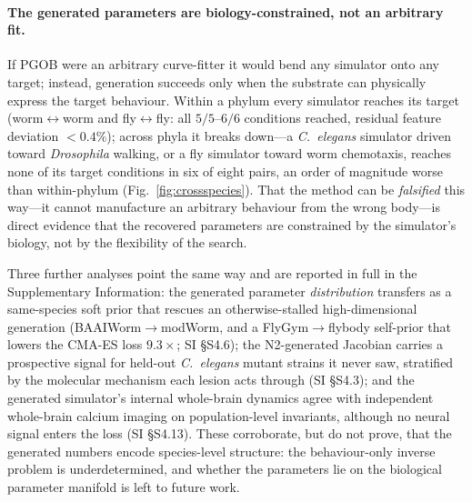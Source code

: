 \documentclass[11pt]{article}
\begin{document}
\paragraph{The generated parameters are biology-constrained, not an arbitrary fit.} If PGOB were an arbitrary curve-fitter it would bend any simulator onto any target; instead, generation succeeds only when the substrate can physically express the target behaviour. Within a phylum every simulator reaches its target (worm$\leftrightarrow$worm and fly$\leftrightarrow$fly: all $5/5$--$6/6$ conditions reached, residual feature deviation $<0.4\%$); across phyla it breaks down---a \emph{C.~elegans} simulator driven toward \emph{Drosophila} walking, or a fly simulator toward worm chemotaxis, reaches none of its target conditions in six of eight pairs, an order of magnitude worse than within-phylum (Fig.~\ref{fig:crossspecies}). That the method can be \emph{falsified} this way---it cannot manufacture an arbitrary behaviour from the wrong body---is direct evidence that the recovered parameters are constrained by the simulator's biology, not by the flexibility of the search.

Three further analyses point the same way and are reported in full in the Supplementary Information: the generated parameter \emph{distribution} transfers as a same-species soft prior that rescues an otherwise-stalled high-dimensional generation (BAAIWorm$\to$modWorm, and a FlyGym$\to$flybody self-prior that lowers the CMA-ES loss $9.3\times$; SI \S S4.6); the N2-generated Jacobian carries a prospective signal for held-out \emph{C.~elegans} mutant strains it never saw, stratified by the molecular mechanism each lesion acts through (SI \S S4.3); and the generated simulator's internal whole-brain dynamics agree with independent whole-brain calcium imaging on population-level invariants, although no neural signal enters the loss (SI \S S4.13). These corroborate, but do not prove, that the generated numbers encode species-level structure: the behaviour-only inverse problem is underdetermined, and whether the parameters lie on the biological parameter manifold is left to future work.
\end{document}
